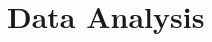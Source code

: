 \documentclass[]{spie}  %
\begin{document}

\section{Data Analysis}
\label{sec:analysis}
\end{document}
